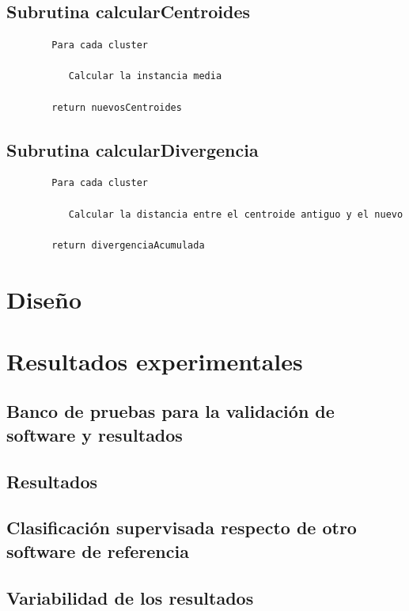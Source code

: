 \documentclass[a4paper]{report}
\begin{document}
	\section{Subrutina calcularCentroides}
	
		\begin{verbatim}
		Para cada cluster
		
		   Calcular la instancia media
		   
		return nuevosCentroides
		\end{verbatim}
	
	\section{Subrutina calcularDivergencia}
	
		\begin{verbatim}
		Para cada cluster 
		   
		   Calcular la distancia entre el centroide antiguo y el nuevo
		   
		return divergenciaAcumulada
		\end{verbatim}

\chapter{Diseño}



\chapter{Resultados experimentales}

	\section{Banco de pruebas para la validación de software y resultados}
	
	\section{Resultados}
	
	\section{Clasificación supervisada respecto de otro software de referencia}
	
	\section{Variabilidad de los resultados}
	
\end{document}
